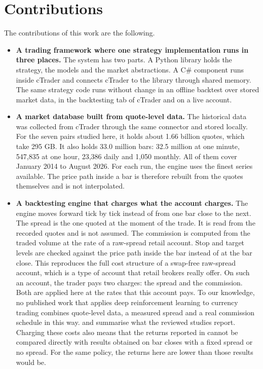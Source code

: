 \section{Contributions}

The contributions of this work are the following.

\begin{itemize}
\item \textbf{A trading framework where one strategy implementation runs in three places.} The system has two parts. A Python library holds the strategy, the models and the market abstractions. A C\# component runs inside cTrader \cite{noauthor_forex_nodate} and connects cTrader to the library through shared memory. The same strategy code runs without change in an offline backtest over stored market data, in the backtesting tab of cTrader and on a live account.

\item \textbf{A market database built from quote-level data.} The historical data was collected from cTrader through the same connector and stored locally. For the seven pairs studied here, it holds about 1.66 billion quotes, which take 295 GB. It also holds 33.0 million bars: 32.5 million at one minute, 547,835 at one hour, 23,386 daily and 1,050 monthly. All of them cover January 2014 to August 2026. For each run, the engine uses the finest series available. The price path inside a bar is therefore rebuilt from the quotes themselves and is not interpolated.

\item \textbf{A backtesting engine that charges what the account charges.} The engine moves forward tick by tick instead of from one bar close to the next. The spread is the one quoted at the moment of the trade. It is read from the recorded quotes and is not assumed. The commission is computed from the traded volume at the rate of a raw-spread retail account. Stop and target levels are checked against the price path inside the bar instead of at the bar close. This reproduces the full cost structure of a swap-free raw-spread account, which is a type of account that retail brokers really offer. On such an account, the trader pays two charges: the spread and the commission. Both are applied here at the rates that this account pays. To our knowledge, no published work that applies deep reinforcement learning to currency trading combines quote-level data, a measured spread and a real commission schedule in this way.  and  summarise what the reviewed studies report. Charging these costs also means that the returns reported in  cannot be compared directly with results obtained on bar closes with a fixed spread or no spread. For the same policy, the returns here are lower than those results would be.


\end{itemize}
